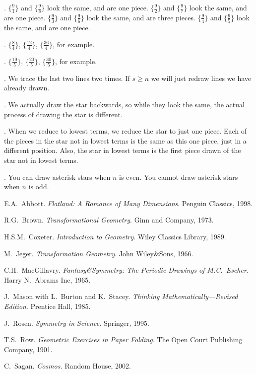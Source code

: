 .  $\{ \frac91\}$ and $\{ \frac98\}$ look the same, and are one piece.  $\{ \frac92\}$ and $\{ \frac97\}$ look the same, and are one piece.  $\{ \frac93\}$ and $\{ \frac96\}$ look the same, and are three pieces.  $\{ \frac94\}$ and $\{ \frac95\}$ look the same, and are one piece.

.  $\{ \frac84\}$, $\{ \frac{12}{4}\}$, $\{ \frac{36}{4}\}$, for example.

.  $\{ \frac{10}{5}\}$, $\{ \frac{20}{5}\}$, $\{ \frac{30}{5}\}$, for example.

.  We trace the last two lines two times.  If $s \geq n$ we will just redraw lines we have already drawn.

.  We actually draw the star backwards, so while they look the same, the actual process of drawing the star is different.

.  When we reduce to lowest terms, we reduce the star to just one piece.  Each of the pieces in the star not in lowest terms is the same as this one piece, just in a different position.  Also, the star in lowest terms is the first piece drawn of the star not in lowest terms.

.  You can draw asterisk stars when $n$ is even.  You cannot draw asterisk stars when $n$ is odd.







\begin{thebibliography}{99}

 E.A.\ Abbott. \emph{Flatland: A Romance of Many Dimensions}. Penguin Classics, 1998.


 R.G.\ Brown. \emph{Transformational Geometry}. Ginn and Company, 1973.


 H.S.M.\ Coxeter. \emph{Introduction to Geometry}. Wiley Classics Library, 1989.

 M.\ Jeger. \emph{Transformation Geometry}. John Wiley\&Sons, 1966.

 C.H.\ MacGillavry. \emph{Fantasy\&Symmetry: The Periodic Drawings of M.C.\ Escher.} Harry N.\ Abrams Inc, 1965.

 J.\ Mason with L.\ Burton and K.\ Stacey. \emph{Thinking Mathematically---Revised Edition}. Prentice Hall, 1985.

 J.\ Rosen. \emph{Symmetry in Science.} Springer, 1995.

 T.S.\ Row. \emph{Geometric Exercises in Paper Folding.} The Open Court Publishing Company, 1901.

 C.\ Sagan. \emph{Cosmos.} Random House, 2002.

\end{thebibliography}


\printindex
